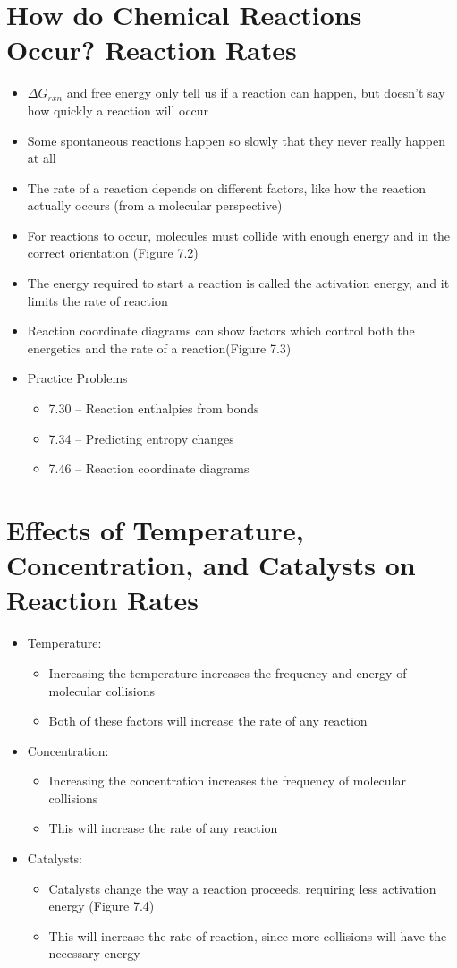 \documentclass[12pt, openany, letterpaper]{memoir}
\begin{document}
\section{How do Chemical Reactions Occur? Reaction Rates}
\begin{itemize}
	\item $\Delta G_{rxn}$ and free energy only tell us if a reaction can happen, but doesn't say how quickly a reaction will occur
	\item Some spontaneous reactions happen so slowly that they never really happen at all
	\item The rate of a reaction depends on different factors, like how the reaction actually occurs (from a molecular perspective)
	\item For reactions to occur, molecules must collide with enough energy and in the correct orientation (Figure 7.2)
	\item The energy required to start a reaction is called the activation energy, and it limits the rate of reaction
	\item Reaction coordinate diagrams can show factors which control both the energetics and the rate of a reaction(Figure 7.3)
	\item Practice Problems
	\begin{itemize}
		\item 7.30 -- Reaction enthalpies from bonds
		\item 7.34 -- Predicting entropy changes
		\item 7.46 -- Reaction coordinate diagrams
	\end{itemize}
\end{itemize}
\section{Effects of Temperature, Concentration, and Catalysts on Reaction Rates}
\begin{itemize}
	\item Temperature:
	\begin{itemize}
		\item Increasing the temperature increases the frequency and energy of molecular collisions
		\item Both of these factors will increase the rate of any reaction
	\end{itemize}
	\item Concentration:
	\begin{itemize}
		\item Increasing the concentration increases the frequency of molecular collisions
		\item This will increase the rate of any reaction
	\end{itemize}
	\item Catalysts:
	\begin{itemize}
		\item Catalysts change the way a reaction proceeds, requiring less activation energy (Figure 7.4)
		\item This will increase the rate of reaction, since more collisions will have the necessary energy
	\end{itemize}
\end{itemize}
\end{document}
